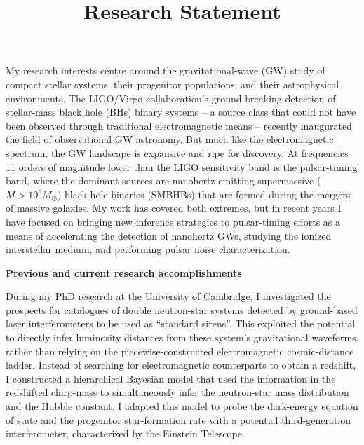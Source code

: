 \documentclass[11pt,letterpaper,sans]{moderncv} %
\title{\huge{Research Statement}}
\begin{document}
\makecvtitle %
\vspace{-6mm}

My research interests centre around the gravitational-wave (GW) study of compact stellar systems, their progenitor populations, and their astrophysical environments. The LIGO/Virgo collaboration's ground-breaking detection of stellar-mass black hole (BHs) binary systems -- a source class that could not have been observed through traditional electromagnetic means -- recently inaugurated the field of observational GW astronomy. But much like the electromagnetic spectrum, the GW landscape is expansive and ripe for discovery. At frequencies 11 orders of magnitude lower than the LIGO sensitivity band is the pulsar-timing band, where the dominant sources are nanohertz-emitting supermassive ($M > 10^8M_\odot$) black-hole binaries (SMBHBs) that are formed during the mergers of massive galaxies. My work has covered both extremes, but in recent years I have focused on bringing new inference strategies to pulsar-timing efforts as a means of accelerating the detection of nanohertz GWs, studying the ionized interstellar medium, and performing pulsar noise characterization.
\vspace{1mm}

\textbf{Previous and current research accomplishments}
\vspace{1mm}

During my PhD research at the University of Cambridge, I investigated the prospects for catalogues of double neutron-star systems detected by ground-based laser interferometers to be used as ``standard sirens''. This exploited the potential to directly infer luminosity distances from these system's gravitational waveforms, rather than relying on the piecewise-constructed electromagnetic cosmic-distance ladder. Instead of searching for electromagnetic counterparts to obtain a redshift, I constructed a hierarchical Bayesian model that used the information in the redshifted chirp-mass to simultaneously infer the neutron-star mass distribution and the Hubble constant. %
I adapted this model to probe the dark-energy equation of state and the progenitor star-formation rate with a potential third-generation interferometer, characterized by the Einstein Telescope.
\vspace{1mm}
\end{document}
